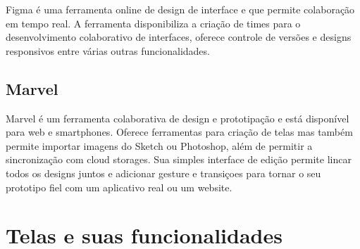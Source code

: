 Figma \cite{figma} é uma ferramenta online de design de interface e que permite colaboração em tempo real. A ferramenta disponibiliza a criação de times para o desenvolvimento colaborativo de interfaces, oferece controle de versões e designs responsivos entre várias outras funcionalidades.


\subsection{Marvel}

Marvel \cite{marvel} é um ferramenta colaborativa de design e prototipação e está disponível para web e smartphones. Oferece ferramentas para criação de telas mas também permite importar imagens do Sketch ou Photoshop, além de permitir a sincronização com cloud storages. Sua simples interface de edição permite lincar todos os designs juntos e adicionar gesture e transiçoes para tornar o seu prototipo fiel com um aplicativo real ou um website.

\section{Telas e suas funcionalidades}
